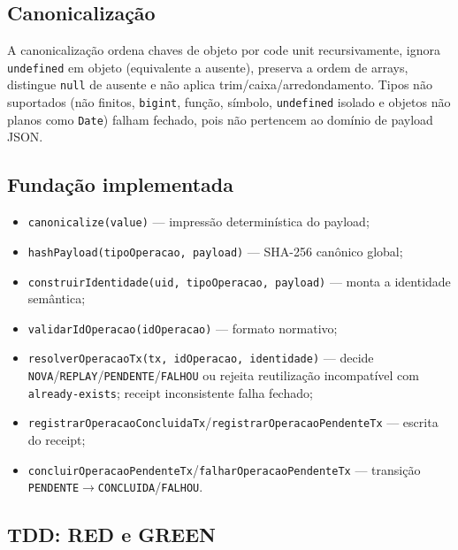 \subsection{Canonicalização}

A canonicalização ordena chaves de objeto por code unit recursivamente, ignora
\texttt{undefined} em objeto (equivalente a ausente), preserva a ordem de
arrays, distingue \texttt{null} de ausente e não aplica trim/caixa/arredondamento.
Tipos não suportados (não finitos, \texttt{bigint}, função, símbolo,
\texttt{undefined} isolado e objetos não planos como \texttt{Date}) falham
fechado, pois não pertencem ao domínio de payload JSON.

\subsection{Fundação implementada}

\begin{center}\small
{}
\end{center}

\begin{itemize}
  \item \texttt{canonicalize(value)} --- impressão determinística do payload;
  \item \texttt{hashPayload(tipoOperacao, payload)} --- SHA-256 canônico global;
  \item \texttt{construirIdentidade(uid, tipoOperacao, payload)} --- monta a
  identidade semântica;
  \item \texttt{validarIdOperacao(idOperacao)} --- formato normativo;
  \item \texttt{resolverOperacaoTx(tx, idOperacao, identidade)} --- decide
  \texttt{NOVA}/\texttt{REPLAY}/\texttt{PENDENTE}/\texttt{FALHOU} ou rejeita
  reutilização incompatível com \texttt{already-exists}; receipt inconsistente
  falha fechado;
  \item \texttt{registrarOperacaoConcluidaTx}/\texttt{registrarOperacaoPendenteTx}
  --- escrita do receipt;
  \item \texttt{concluirOperacaoPendenteTx}/\texttt{falharOperacaoPendenteTx} ---
  transição \texttt{PENDENTE}$\rightarrow$\texttt{CONCLUIDA}/\texttt{FALHOU}.
\end{itemize}

\subsection{TDD: RED e GREEN}

